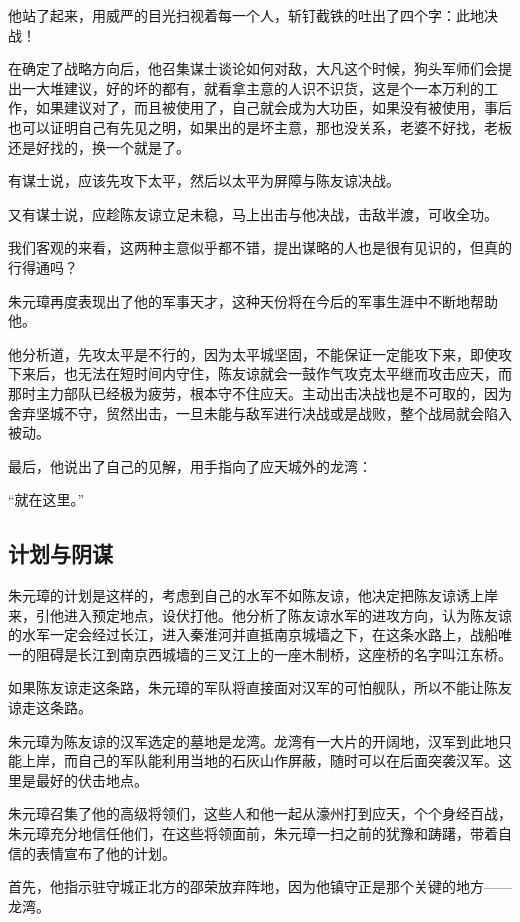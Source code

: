 \begin{multicols}{\theparacolNo}
		他站了起来，用威严的目光扫视着每一个人，斩钉截铁的吐出了四个字：此地决战！

		在确定了战略方向后，他召集谋士谈论如何对敌，大凡这个时候，狗头军师们会提出一大堆建议，好的坏的都有，就看拿主意的人识不识货，这是个一本万利的工作，如果建议对了，而且被使用了，自己就会成为大功臣，如果没有被使用，事后也可以证明自己有先见之明，如果出的是坏主意，那也没关系，老婆不好找，老板还是好找的，换一个就是了。

		有谋士说，应该先攻下太平，然后以太平为屏障与陈友谅决战。

		又有谋士说，应趁陈友谅立足未稳，马上出击与他决战，击敌半渡，可收全功。

		我们客观的来看，这两种主意似乎都不错，提出谋略的人也是很有见识的，但真的行得通吗？

		朱元璋再度表现出了他的军事天才，这种天份将在今后的军事生涯中不断地帮助他。

		他分析道，先攻太平是不行的，因为太平城坚固，不能保证一定能攻下来，即使攻下来后，也无法在短时间内守住，陈友谅就会一鼓作气攻克太平继而攻击应天，而那时主力部队已经极为疲劳，根本守不住应天。主动出击决战也是不可取的，因为舍弃坚城不守，贸然出击，一旦未能与敌军进行决战或是战败，整个战局就会陷入被动。

		最后，他说出了自己的见解，用手指向了应天城外的龙湾：

		“就在这里。”

		\subsection{计划与阴谋}
		朱元璋的计划是这样的，考虑到自己的水军不如陈友谅，他决定把陈友谅诱上岸来，引他进入预定地点，设伏打他。他分析了陈友谅水军的进攻方向，认为陈友谅的水军一定会经过长江，进入秦淮河并直抵南京城墙之下，在这条水路上，战船唯一的阻碍是长江到南京西城墙的三叉江上的一座木制桥，这座桥的名字叫江东桥。

		如果陈友谅走这条路，朱元璋的军队将直接面对汉军的可怕舰队，所以不能让陈友谅走这条路。

		朱元璋为陈友谅的汉军选定的墓地是龙湾。龙湾有一大片的开阔地，汉军到此地只能上岸，而自己的军队能利用当地的石灰山作屏蔽，随时可以在后面突袭汉军。这里是最好的伏击地点。

		朱元璋召集了他的高级将领们，这些人和他一起从濠州打到应天，个个身经百战，朱元璋充分地信任他们，在这些将领面前，朱元璋一扫之前的犹豫和踌躇，带着自信的表情宣布了他的计划。

		首先，他指示驻守城正北方的邵荣放弃阵地，因为他镇守正是那个关键的地方——龙湾。


\end{multicols}
